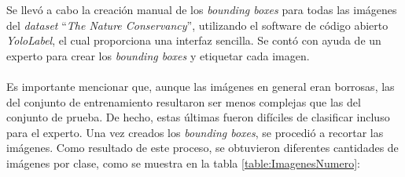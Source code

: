 Se llevó a cabo la creación manual de los \textit{bounding boxes} para todas las 
imágenes del \textit{dataset} ``\textit{The Nature Conservancy}'', utilizando el 
software de código abierto \textit{YoloLabel}, el cual proporciona una interfaz 
sencilla. Se contó con ayuda de un experto para crear los \textit{bounding boxes} 
y etiquetar cada imagen.
\\\\
Es importante mencionar que, aunque las imágenes en general eran borrosas, las del 
conjunto de entrenamiento resultaron ser menos complejas que las del conjunto de 
prueba. De hecho, estas últimas fueron difíciles de clasificar incluso para el 
experto. Una vez creados los \textit{bounding boxes}, se procedió a recortar las 
imágenes. Como resultado de este proceso, se obtuvieron diferentes cantidades de 
imágenes por clase, como se muestra en la tabla \ref{table:ImagenesNumero}:
\\
